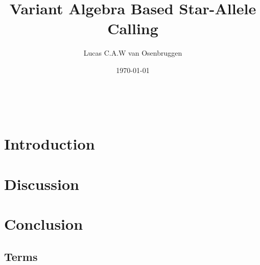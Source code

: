 \documentclass[a4paper, 10pt]{article}
\title{Variant Algebra Based Star-Allele Calling\\}
\author[1]{Lucas C.A.W van Osenbruggen}
\affil[1]{Leiden Institute of Advanced Computer Science, Leiden University}
\date{\today}
\begin{document}
%
\maketitle
\cite{Vis2023AVariants}\\
\thispagestyle{fancy}
\newpage
%
\begin{abstract}
    
\end{abstract}
\newpage
%
\section{Introduction}
\label{section:Introduction}

\newpage
%
%
\section{Discussion}
\label{section:Discussion}

\newpage
%
\section{Conclusion}
\label{section:Conclusion}

\newpage
%
\printbibliography
\newpage
%
\begin{appendix}
    \section{Terms}
    \label{appendix:Glossary}
    \printglossaries
\end{appendix}
%
\end{document}
